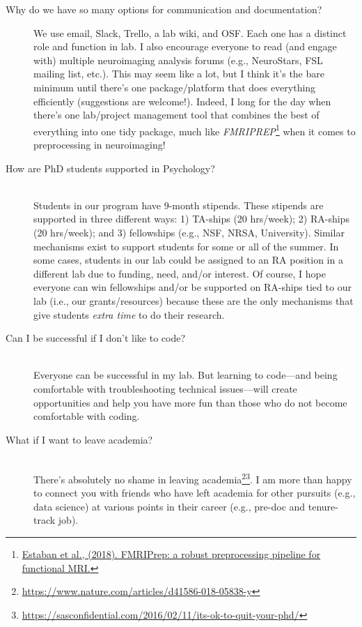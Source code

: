 \documentclass[letterpaper,12pt,oneside]{memoir}
\begin{document}
\begin{description}
\item[Why do we have so many options for communication and documentation?] \hfill
We use email, Slack, Trello, a lab wiki, and OSF. Each one has a distinct role and function in lab. I also encourage everyone to read (and engage with) multiple neuroimaging analysis forums (e.g., NeuroStars, FSL mailing list, etc.). This may seem like a lot, but I think it's the bare minimum until there's one package/platform that does everything efficiently (suggestions are welcome!). Indeed, I long for the day when there's one lab/project management tool that combines the best of everything into one tidy package, much like \textit{FMRIPREP}\footnote{\href{https://www.biorxiv.org/content/early/2018/07/24/306951}{Estaban et al., (2018). FMRIPrep: a robust preprocessing pipeline for functional MRI.}} when it comes to preprocessing in neuroimaging! 
\item[How are PhD students supported in Psychology?] \hfill \\
Students in our program have 9-month stipends. These stipends are supported in three different ways: 1) TA-ships (20 hrs/week); 2) RA-ships (20 hrs/week); and 3) fellowships (e.g., NSF, NRSA, University). Similar mechanisms exist to support students for some or all of the summer. In some cases, students in our lab could be assigned to an RA position in a different lab due to funding, need, and/or interest. Of course, I hope everyone can win fellowships and/or be supported on RA-ships tied to our lab (i.e., our grants/resources) because these are the only mechanisms that give students \textit{extra time} to do their research. 
\item[Can I be successful if I don't like to code?] \hfill \\
Everyone can be successful in my lab. But learning to code---and being comfortable with troubleshooting technical issues---will create opportunities and help you have more fun than those who do not become comfortable with coding.
\item[What if I want to leave academia?] \hfill \\
There's absolutely no shame in leaving academia\footnote{\url{https://www.nature.com/articles/d41586-018-05838-y}}\footnote{\url{https://sasconfidential.com/2016/02/11/its-ok-to-quit-your-phd/}}. I am more than happy to connect you with friends who have left academia for other pursuits (e.g., data science) at various points in their career (e.g., pre-doc and tenure-track job). 
\end{description}
\end{document}
